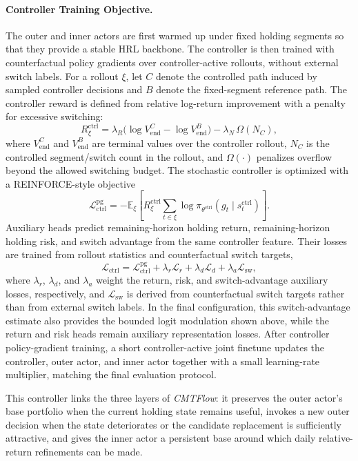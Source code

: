 \documentclass[letterpaper]{article} %
\begin{document}
\paragraph{Controller Training Objective.}
The outer and inner actors are first warmed up under fixed holding segments so that they provide a stable HRL backbone. The controller is then trained with counterfactual policy gradients over controller-active rollouts, without external switch labels. For a rollout \(\xi\), let \(C\) denote the controlled path induced by sampled controller decisions and \(B\) denote the fixed-segment reference path. The controller reward is defined from relative log-return improvement with a penalty for excessive switching:
\[
R_{\xi}^{\mathrm{ctrl}}
=
\lambda_R\bigl(\log V_{\mathrm{end}}^{C}-\log V_{\mathrm{end}}^{B}\bigr)
-
\lambda_N\,\Omega(N_C),
\]
where \(V_{\mathrm{end}}^{C}\) and \(V_{\mathrm{end}}^{B}\) are terminal values over the controller rollout, \(N_C\) is the controlled segment/switch count in the rollout, and \(\Omega(\cdot)\) penalizes overflow beyond the allowed switching budget. The stochastic controller is optimized with a REINFORCE-style objective
\[
\mathcal{L}_{\mathrm{ctrl}}^{\mathrm{pg}}
=
-\mathbb{E}_{\xi}\!\left[
R_{\xi}^{\mathrm{ctrl}}
\sum_{t\in\xi}\log\pi_{\theta^{\mathrm{ctrl}}}(g_t\mid s_t^{\mathrm{ctrl}})
\right].
\]
Auxiliary heads predict remaining-horizon holding return, remaining-horizon holding risk, and switch advantage from the same controller feature. Their losses are trained from rollout statistics and counterfactual switch targets,
\[
\mathcal{L}_{\mathrm{ctrl}}
=
\mathcal{L}_{\mathrm{ctrl}}^{\mathrm{pg}}
+\lambda_r\mathcal{L}_{r}
+\lambda_d\mathcal{L}_{d}
+\lambda_a\mathcal{L}_{\mathrm{sw}},
\]
where \(\lambda_r\), \(\lambda_d\), and \(\lambda_a\) weight the return, risk, and switch-advantage auxiliary losses, respectively, and \(\mathcal{L}_{\mathrm{sw}}\) is derived from counterfactual switch targets rather than from external switch labels. In the final configuration, this switch-advantage estimate also provides the bounded logit modulation shown above, while the return and risk heads remain auxiliary representation losses. After controller policy-gradient training, a short controller-active joint finetune updates the controller, outer actor, and inner actor together with a small learning-rate multiplier, matching the final evaluation protocol.

This controller links the three layers of \textit{CMTFlow}: it preserves the outer actor's base portfolio when the current holding state remains useful, invokes a new outer decision when the state deteriorates or the candidate replacement is sufficiently attractive, and gives the inner actor a persistent base around which daily relative-return refinements can be made.
\end{document}
